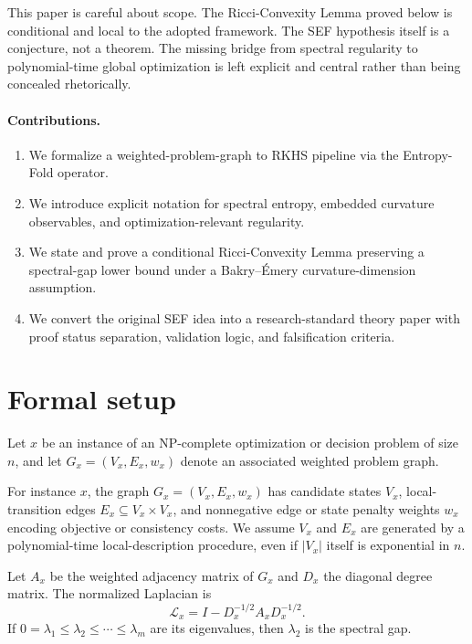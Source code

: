 \documentclass{svjour3}
\begin{document}
This paper is careful about scope. The Ricci-Convexity Lemma proved below is conditional and local to the adopted framework. The SEF hypothesis itself is a conjecture, not a theorem. The missing bridge from spectral regularity to polynomial-time global optimization is left explicit and central rather than being concealed rhetorically.

\paragraph{Contributions.}
\begin{enumerate}[leftmargin=*]
\item We formalize a weighted-problem-graph to RKHS pipeline via the Entropy-Fold operator.
\item We introduce explicit notation for spectral entropy, embedded curvature observables, and optimization-relevant regularity.
\item We state and prove a conditional Ricci-Convexity Lemma preserving a spectral-gap lower bound under a Bakry--\'Emery curvature-dimension assumption.
\item We convert the original SEF idea into a research-standard theory paper with proof status separation, validation logic, and falsification criteria.
\end{enumerate}

\section{Formal setup}
Let $x$ be an instance of an NP-complete optimization or decision problem of size $n$, and let $G_x=(V_x,E_x,w_x)$ denote an associated weighted problem graph.

\begin{definition}
For instance $x$, the graph $G_x=(V_x,E_x,w_x)$ has candidate states $V_x$, local-transition edges $E_x\subseteq V_x\times V_x$, and nonnegative edge or state penalty weights $w_x$ encoding objective or consistency costs. We assume $V_x$ and $E_x$ are generated by a polynomial-time local-description procedure, even if $|V_x|$ itself is exponential in $n$.
\end{definition}

\begin{definition}
Let $A_x$ be the weighted adjacency matrix of $G_x$ and $D_x$ the diagonal degree matrix. The normalized Laplacian is
\[
\mathcal{L}_x = I - D_x^{-1/2}A_xD_x^{-1/2}.
\]
If $0=\lambda_1\le \lambda_2\le \cdots \le \lambda_m$ are its eigenvalues, then $\lambda_2$ is the spectral gap.
\end{definition}
\end{document}
